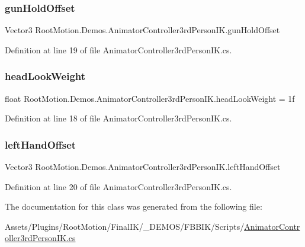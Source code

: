\subsubsection{\texorpdfstring{gun\+Hold\+Offset}{gunHoldOffset}}
{\footnotesize\ttfamily Vector3 Root\+Motion.\+Demos.\+Animator\+Controller3rd\+Person\+I\+K.\+gun\+Hold\+Offset}



Definition at line 19 of file Animator\+Controller3rd\+Person\+I\+K.\+cs.

\mbox{\label{class_root_motion_1_1_demos_1_1_animator_controller3rd_person_i_k_a2a01a7c8cd9e342fe96e6732d7d3c7a6}} 
\subsubsection{\texorpdfstring{head\+Look\+Weight}{headLookWeight}}
{\footnotesize\ttfamily float Root\+Motion.\+Demos.\+Animator\+Controller3rd\+Person\+I\+K.\+head\+Look\+Weight = 1f}



Definition at line 18 of file Animator\+Controller3rd\+Person\+I\+K.\+cs.

\mbox{\label{class_root_motion_1_1_demos_1_1_animator_controller3rd_person_i_k_a8b8854330ab946b0cc3774e04d53feda}} 
\subsubsection{\texorpdfstring{left\+Hand\+Offset}{leftHandOffset}}
{\footnotesize\ttfamily Vector3 Root\+Motion.\+Demos.\+Animator\+Controller3rd\+Person\+I\+K.\+left\+Hand\+Offset}



Definition at line 20 of file Animator\+Controller3rd\+Person\+I\+K.\+cs.



The documentation for this class was generated from the following file\+:\begin{DoxyCompactItemize}
\item 
Assets/\+Plugins/\+Root\+Motion/\+Final\+I\+K/\+\_\+\+D\+E\+M\+O\+S/\+F\+B\+B\+I\+K/\+Scripts/\mbox{\hyperlink{_animator_controller3rd_person_i_k_8cs}{Animator\+Controller3rd\+Person\+I\+K.\+cs}}\end{DoxyCompactItemize}
